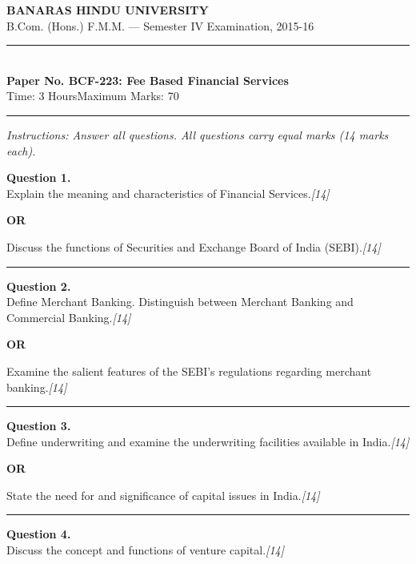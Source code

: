 \documentclass[11pt,a4paper]{article}
\newcommand{\pts}[1]{\hfill   \textit{[#1]}}
\begin{document}
\begin{center}
  {\large\bfseries BANARAS HINDU UNIVERSITY}\\[2pt]
  {\normalsize B.Com. (Hons.) F.M.M. --- Semester IV Examination, 2015-16}\\[6pt]
  \rule{0.8\linewidth}{0.5pt}\\[6pt]
  {\large\bfseries Paper No. BCF-223: Fee Based Financial Services}\\[4pt]
  {\normalsize Time: 3 Hours\hfill Maximum Marks: 70}
\end{center}

\rule{\linewidth}{0.4pt}

\smallskip



\noindent   \textit{Instructions: Answer all questions. All questions carry equal marks (14 marks each).}

\bigskip




\noindent   \textbf{Question 1.} \\
Explain the meaning and characteristics of Financial Services.\pts{14}

\centerline{   \textbf{OR}}

Discuss the functions of Securities and Exchange Board of India (SEBI).\pts{14}

\medskip\rule{\linewidth}{0.2pt}




\noindent   \textbf{Question 2.} \\
Define Merchant Banking. Distinguish between Merchant Banking and Commercial Banking.\pts{14}

\centerline{   \textbf{OR}}

Examine the salient features of the SEBI's regulations regarding merchant banking.\pts{14}

\medskip\rule{\linewidth}{0.2pt}

\pagebreak




\noindent   \textbf{Question 3.} \\
Define underwriting and examine the underwriting facilities available in India.\pts{14}

\centerline{   \textbf{OR}}

State the need for and significance of capital issues in India.\pts{14}

\medskip\rule{\linewidth}{0.2pt}




\noindent   \textbf{Question 4.} \\
Discuss the concept and functions of venture capital.\pts{14}
\end{document}
